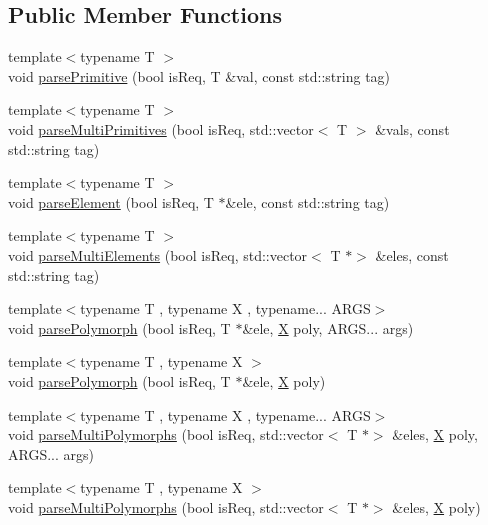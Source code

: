 \subsection*{Public Member Functions}
\begin{DoxyCompactItemize}
\item 
{\footnotesize template$<$typename T $>$ }\\void \hyperlink{classParseInterface_a86b7469a47ed83434a55ca1974a7287e}{parse\+Primitive} (bool is\+Req, T \&val, const std\+::string tag)
\item 
{\footnotesize template$<$typename T $>$ }\\void \hyperlink{classParseInterface_a0d16b9baf79eb34c63914159798dc1eb}{parse\+Multi\+Primitives} (bool is\+Req, std\+::vector$<$ T $>$ \&vals, const std\+::string tag)
\item 
{\footnotesize template$<$typename T $>$ }\\void \hyperlink{classParseInterface_a289c74beb3acea103f9864f2225bce00}{parse\+Element} (bool is\+Req, T $\ast$\&ele, const std\+::string tag)
\item 
{\footnotesize template$<$typename T $>$ }\\void \hyperlink{classParseInterface_aca9ff3a3139e6939cb7b0c8612d4a609}{parse\+Multi\+Elements} (bool is\+Req, std\+::vector$<$ T $\ast$$>$ \&eles, const std\+::string tag)
\item 
{\footnotesize template$<$typename T , typename X , typename... A\+R\+GS$>$ }\\void \hyperlink{classParseInterface_af24b31d7ffc3029b8a7a67f986ab414f}{parse\+Polymorph} (bool is\+Req, T $\ast$\&ele, \hyperlink{classX}{X} poly, A\+R\+G\+S... args)
\item 
{\footnotesize template$<$typename T , typename X $>$ }\\void \hyperlink{classParseInterface_a3eddda17bca991a068b171fb6949bce8}{parse\+Polymorph} (bool is\+Req, T $\ast$\&ele, \hyperlink{classX}{X} poly)
\item 
{\footnotesize template$<$typename T , typename X , typename... A\+R\+GS$>$ }\\void \hyperlink{classParseInterface_ab742098ba7badf016388bd10b32fb1ee}{parse\+Multi\+Polymorphs} (bool is\+Req, std\+::vector$<$ T $\ast$$>$ \&eles, \hyperlink{classX}{X} poly, A\+R\+G\+S... args)
\item 
{\footnotesize template$<$typename T , typename X $>$ }\\void \hyperlink{classParseInterface_a3d1afd8bdd00110808e3c42320556544}{parse\+Multi\+Polymorphs} (bool is\+Req, std\+::vector$<$ T $\ast$$>$ \&eles, \hyperlink{classX}{X} poly)
$$
\end{DoxyCompactItemize}

